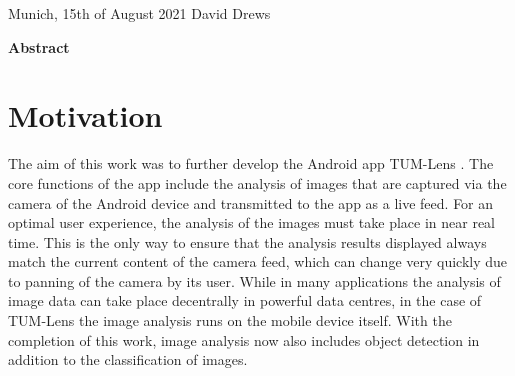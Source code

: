 \documentclass[
			   fontsize=11pt,
               paper=a4,
               bibliography=totoc,
               idxtotoc,
               headsepline,
               footsepline,
               footinclude=false,
               BCOR=12mm,
               DIV=13,
               openany,   %
               ]
               {scrbook}
\def\author{David Drews}
\def\date{15th of August 2021}
\begin{document}
\vspace{15mm}
\noindent
Munich, \date \hspace{5cm} \author
\cleardoubleemptypage


{}
\vspace*{2cm}
\begin{center}
    {\Large \textbf {Abstract}}
\end{center}
\vspace{1cm}

\lipsum[2]

\cleardoublepage


\tableofcontents
\thispagestyle{empty}
\cleardoubleemptypage


\mainmatter
\chapter{Motivation}

The aim of this work was to further develop the Android app TUM-Lens \cite{lensApp}. The core functions of the app include the analysis of images that are captured via the camera of the Android device and transmitted to the app as a live feed. For an optimal user experience, the analysis of the images must take place in near real time. This is the only way to ensure that the analysis results displayed always match the current content of the camera feed, which can change very quickly due to panning of the camera by its user. While in many applications the analysis of image data can take place decentrally in powerful data centres, in the case of TUM-Lens the image analysis runs on the mobile device itself. With the completion of this work, image analysis now also includes object detection in addition to the classification of images.
\end{document}

